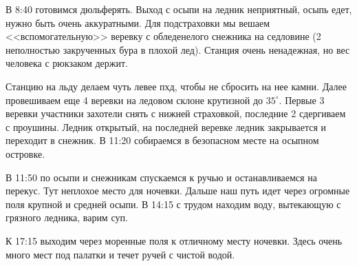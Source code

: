     В 8:40 готовимся дюльферять. Выход с осыпи на ледник неприятный, осыпь едет, нужно быть очень аккуратными. Для
    подстраховки мы вешаем <<вспомогательную>> веревку с обледенелого снежника на седловине (2 неполностью закрученных
    бура в плохой лед). Станция очень ненадежная, но вес человека с рюкзаком держит.

    Станцию на льду делаем чуть левее пхд, чтобы не сбросить на нее камни. Далее провешиваем еще 4 веревки на ледовом
    склоне крутизной до $35^\circ$. Первые 3 веревки участники захотели снять с нижней страховкой, последние 2
    сдергиваем с проушины. Ледник открытый, на последней веревке ледник закрывается и переходит в снежник. В 11:20
    собираемся в безопасном месте на осыпном островке.

    В 11:50 по осыпи и снежникам спускаемся к ручью и останавливаемся на перекус. Тут неплохое место для ночевки.
    Дальше наш путь идет через огромные поля крупной и средней осыпи. В 14:15 с трудом находим воду, вытекающую с
    грязного ледника, варим суп.

    К 17:15 выходим через моренные поля к отличному месту ночевки. Здесь очень много мест под палатки и течет ручей
    с чистой водой.

    \FloatBarrier
    
    
    
    
    
    
    
    
    
    
    
    
